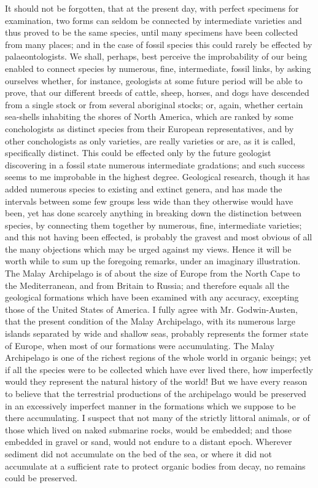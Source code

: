 It should not be forgotten, that at the present day, with perfect specimens for examination, two forms can seldom be connected by intermediate varieties and thus proved to be the same species, until many specimens have been collected from many places; and in the case of fossil species this could rarely be effected by palaeontologists. We shall, perhaps, best perceive the improbability of our being enabled to connect species by numerous, fine, intermediate, fossil links, by asking ourselves whether, for instance, geologists at some future period will be able to prove, that our different breeds of cattle, sheep, horses, and dogs have descended from a single stock or from several aboriginal stocks; or, again, whether certain sea-shells inhabiting the shores of North America, which are ranked by some conchologists as distinct species from their European representatives, and by other conchologists as only varieties, are really varieties or are, as it is called, specifically distinct. This could be effected only by the future geologist discovering in a fossil state numerous intermediate gradations; and such success seems to me improbable in the highest degree.
Geological research, though it has added numerous species to existing and extinct genera, and has made the intervals between some few groups less wide than they otherwise would have been, yet has done scarcely anything in breaking down the distinction between species, by connecting them together by numerous, fine, intermediate varieties; and this not having been effected, is probably the gravest and most obvious of all the many objections which may be urged against my views. Hence it will be worth while to sum up the foregoing remarks, under an imaginary illustration. The Malay Archipelago is of about the size of Europe from the North Cape to the Mediterranean, and from Britain to Russia; and therefore equals all the geological formations which have been examined with any accuracy, excepting those of the United States of America. I fully agree with Mr. Godwin-Austen, that the present condition of the Malay Archipelago, with its numerous large islands separated by wide and shallow seas, probably represents the former state of Europe, when most of our formations were accumulating. The Malay Archipelago is one of the richest regions of the whole world in organic beings; yet if all the species were to be collected which have ever lived there, how imperfectly would they represent the natural history of the world!
But we have every reason to believe that the terrestrial productions of the archipelago would be preserved in an excessively imperfect manner in the formations which we suppose to be there accumulating. I suspect that not many of the strictly littoral animals, or of those which lived on naked submarine rocks, would be embedded; and those embedded in gravel or sand, would not endure to a distant epoch. Wherever sediment did not accumulate on the bed of the sea, or where it did not accumulate at a sufficient rate to protect organic bodies from decay, no remains could be preserved.
